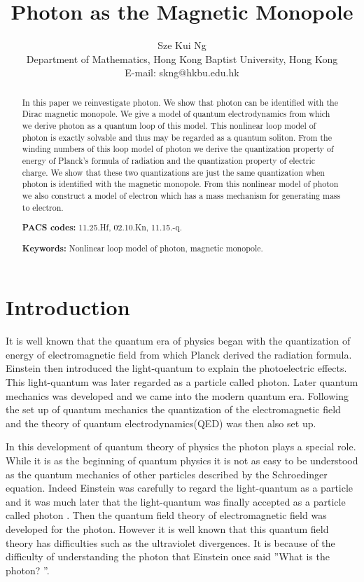 \documentclass[a4paper,a4paper]{article}
\title{Photon as the Magnetic Monopole}
\author{Sze Kui Ng
\\  Department of Mathematics,
Hong Kong Baptist University, Hong Kong
\\E-mail: skng@hkbu.edu.hk
}
\begin{document}
\date{}
\maketitle
\begin{abstract}

In this paper we reinvestigate photon. We show that photon can be identified with the Dirac magnetic monopole. We give a model of quantum electrodynamics from which we derive photon as a quantum loop of this model. This nonlinear loop model of photon is exactly solvable and thus  may be regarded as a quantum soliton. From the winding numbers of this loop model of photon we derive the quantization property of energy of Planck's formula of radiation and the quantization property of electric charge. We show that these two quantizations are just the same quantization when photon is identified with the magnetic monopole. From this nonlinear model of photon we also construct a model of electron which has a mass mechanism for generating mass to electron.

{\bf PACS codes: } 11.25.Hf, 02.10.Kn,  11.15.-q.

{\bf Keywords:} Nonlinear loop model of photon, magnetic monopole.

\end{abstract}

\section{Introduction}\label{sec00}

                                        

It is well known that the quantum era of physics began with the quantization of energy of electromagnetic field from which Planck derived the radiation formula. Einstein then introduced the light-quantum to explain the photoelectric effects. This light-quantum was later regarded as a particle called  photon\cite{Pai}\cite{Pla}\cite{Ein}. Later quantum mechanics was developed and we came into the modern quantum era. Following the set up of quantum mechanics the quantization of the electromagnetic field and the theory of quantum electrodynamics(QED) was then also set up.

In this development of quantum theory of physics  the photon plays a special role. While it is as the beginning of quantum physics it is not as easy to be understood as the quantum mechanics of other particles described by the Schroedinger equation. Indeed Einstein was carefully to regard the light-quantum as a particle and it was much later that the light-quantum was finally accepted as a particle called photon \cite{Pai}. Then the quantum field theory of electromagnetic field was developed for the photon. However it is well known that this quantum field theory has difficulties such as the ultraviolet divergences. It is because of the difficulty of understanding the photon that Einstein once said ''What is the photon? ''\cite{Pai}. 
\end{document}
